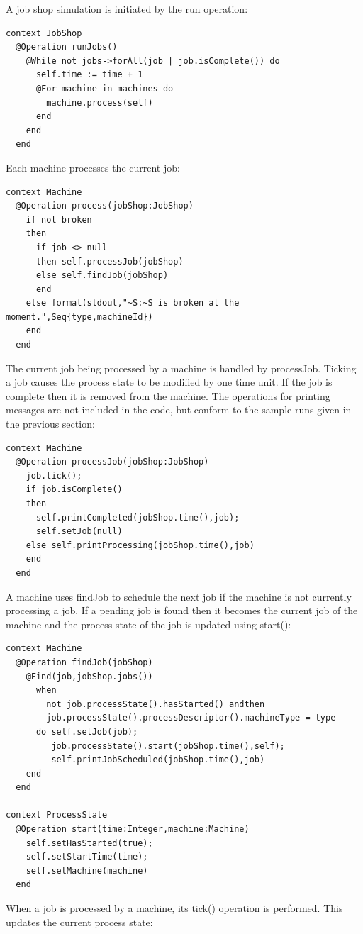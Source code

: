 A job shop simulation is initiated by the run operation:

\begin{lstlisting}
context JobShop
  @Operation runJobs()
    @While not jobs->forAll(job | job.isComplete()) do
      self.time := time + 1
      @For machine in machines do
        machine.process(self)
      end
    end
  end
\end{lstlisting}Each machine processes the current job:

\begin{lstlisting}
context Machine
  @Operation process(jobShop:JobShop)
    if not broken
    then
      if job <> null
      then self.processJob(jobShop)
      else self.findJob(jobShop)
      end
    else format(stdout,"~S:~S is broken at the moment.",Seq{type,machineId})
    end
  end
\end{lstlisting}The current job being processed by a machine is handled by processJob.
Ticking a job causes the process state to be modified by one time
unit. If the job is complete then it is removed from the machine.
The operations for printing messages are not included in the code,
but conform to the sample runs given in the previous section:

\begin{lstlisting}
context Machine
  @Operation processJob(jobShop:JobShop)
    job.tick();
    if job.isComplete() 
    then 
      self.printCompleted(jobShop.time(),job);
      self.setJob(null)
    else self.printProcessing(jobShop.time(),job)
    end
  end
\end{lstlisting}A machine uses findJob to schedule the next job if the machine is
not currently processing a job. If a pending job is found then it
becomes the current job of the machine and the process state of the
job is updated using start():

\begin{lstlisting}
context Machine
  @Operation findJob(jobShop)
    @Find(job,jobShop.jobs())
      when 
        not job.processState().hasStarted() andthen
        job.processState().processDescriptor().machineType = type
      do self.setJob(job);
         job.processState().start(jobShop.time(),self);
         self.printJobScheduled(jobShop.time(),job)
    end
  end

context ProcessState
  @Operation start(time:Integer,machine:Machine)
    self.setHasStarted(true);
    self.setStartTime(time);
    self.setMachine(machine)
  end
\end{lstlisting}When a job is processed by a machine, its tick() operation is performed.
This updates the current process state:

